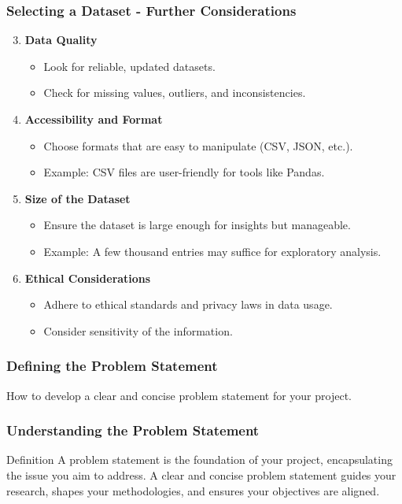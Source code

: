 \documentclass[aspectratio=169]{beamer}
\begin{document}
\begin{frame}[fragile]
    \frametitle{Selecting a Dataset - Further Considerations}
    \begin{enumerate}
        \setcounter{enumi}{2}
        \item \textbf{Data Quality}
            \begin{itemize}
                \item Look for reliable, updated datasets.
                \item Check for missing values, outliers, and inconsistencies.
            \end{itemize}
        \item \textbf{Accessibility and Format}
            \begin{itemize}
                \item Choose formats that are easy to manipulate (CSV, JSON, etc.).
                \item Example: CSV files are user-friendly for tools like Pandas.
            \end{itemize}
        \item \textbf{Size of the Dataset}
            \begin{itemize}
                \item Ensure the dataset is large enough for insights but manageable.
                \item Example: A few thousand entries may suffice for exploratory analysis.
            \end{itemize}
        \item \textbf{Ethical Considerations}
            \begin{itemize}
                \item Adhere to ethical standards and privacy laws in data usage.
                \item Consider sensitivity of the information.
            \end{itemize}
    \end{enumerate}
\end{frame}

\begin{frame}[fragile]
    \frametitle{Defining the Problem Statement}
    How to develop a clear and concise problem statement for your project.
\end{frame}

\begin{frame}[fragile]
    \frametitle{Understanding the Problem Statement}
    \begin{block}{Definition}
        A problem statement is the foundation of your project, encapsulating the issue you aim to address. A clear and concise problem statement guides your research, shapes your methodologies, and ensures your objectives are aligned.
    \end{block}
\end{frame}
\end{document}
